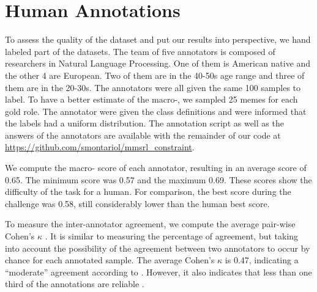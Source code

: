 \section{Human Annotations}
\label{sec:annotations}
To assess the quality of the dataset and put our results into perspective, we hand labeled part of the datasets.
The team of five annotators is composed of researchers in Natural Language Processing. One of them is American native and the other 4 are European. Two of them are in the 40-50s age range and three of them are in the 20-30s.
The annotators were all given the same 100 samples to label.
To have a better estimate of the macro-\fone{}, we sampled 25 memes for each gold role.
The annotator were given the class definitions and were informed that the labels had a uniform distribution.
The annotation script as well as the answers of the annotators are available with the remainder of our code at \url{https://github.com/smontariol/mmsrl_constraint}.

We compute the macro-\fone{} score of each annotator, resulting in an average score of 0.65. The minimum score was 0.57 and the maximum 0.69. These scores show the difficulty of the task for a human. For comparison, the best score during the challenge was 0.58, still considerably lower than the human best score.

To measure the inter-annotator agreement, we compute the average pair-wise Cohen's $\kappa$ \cite{cohenkappa}. It is similar to measuring the percentage of agreement, but taking into account the possibility of the agreement between two annotators to occur by chance for each annotated sample.
The average Cohen's $\kappa$ is 0.47, indicating a ``moderate'' agreement according to \citet{cohenkappa}. However, it also indicates that less than one third of the annotations are reliable \cite{mchugh2012interrater}.


